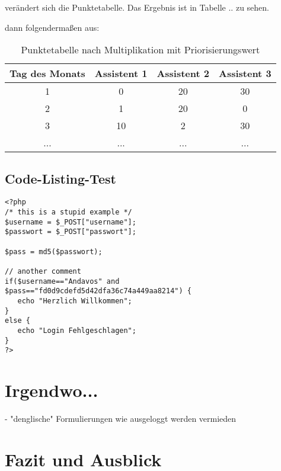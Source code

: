 \documentclass[12pt,a4paper,titlepage]{article} %
\begin{document}
verändert sich die Punktetabelle. %
Das Ergebnis ist in Tabelle .. zu sehen.

 dann folgendermaßen aus: %
 \begin{table}[htb]
	\centering
\begin{tabular}{|c|c|c|c|}
\hline 
Tag des Monats & Assistent 1 & Assistent 2 & Assistent 3 \\ 
\hline 
1 & 0 & 20 & 30 \\ 
\hline 
2 & 1 & 20 & 0 \\ 
\hline 
3 & 10 & 2 & 30 \\ 
\hline 
... & ... & ... & ... \\ 
\hline 
\end{tabular}
\caption{Punktetabelle nach Multiplikation mit Priorisierungswert}
	\label{tab:scoreTable2}
\end{table}








\subsection{Code-Listing-Test}
\begin{lstlisting}
<?php
/* this is a stupid example */
$username = $_POST["username"];
$passwort = $_POST["passwort"];

$pass = md5($passwort);

// another comment
if($username=="Andavos" and
$pass=="fd0d9cdefd5d42dfa36c74a449aa8214") {
   echo "Herzlich Willkommen";
}
else {
   echo "Login Fehlgeschlagen";
}
?>
\end{lstlisting}

\clearpage
\newpage

\section{Irgendwo...}
- "denglische" Formulierungen wie ausgeloggt werden vermieden

\section{Fazit und Ausblick} %
\end{document}
